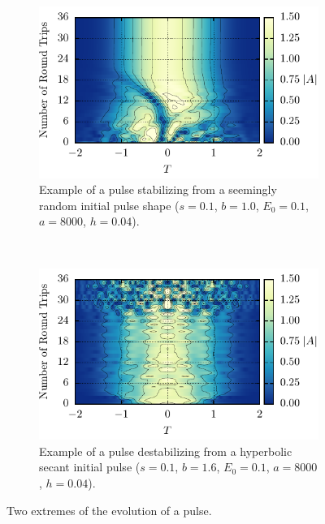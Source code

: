 \documentclass[10pt,twocolumn,a4paper]{article}
\begin{document}
\begin{figure}[tb]
	\centering
	\begin{subfigure}{\columnwidth}
		\centering
		\includegraphics{Conv}
		\caption{Example of a pulse stabilizing from a seemingly random initial pulse shape ($s = 0.1$, $b = 1.0$, $E_0 = 0.1$, $a = 8000$, $h = 0.04$).}
		\label{fig:convevo}
	\end{subfigure} \\
	\begin{subfigure}{\columnwidth}
		\centering
		\includegraphics{Break}
		\caption{Example of a pulse destabilizing from a hyperbolic secant initial pulse ($s = 0.1$, $b = 1.6$, $E_0 = 0.1$, $a = 8000$, $h = 0.04$).}
		\label{fig:breakevo}
	\end{subfigure}
	\caption{Two extremes of the evolution of a pulse.}
	\label{fig:evolution}
\end{figure}
\end{document}
